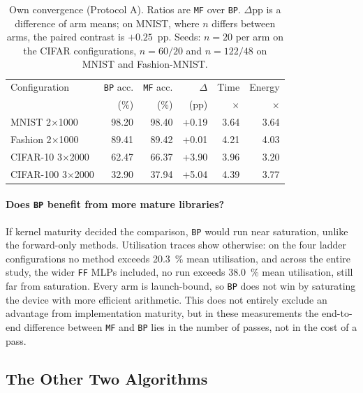 \documentclass{llncs}
\newcommand{\FF}{\texttt{FF}}
\newcommand{\MF}{\texttt{MF}}
\newcommand{\BP}{\texttt{BP}}
\begin{document}
\begin{table}[tb]
  \centering
  \caption{Own convergence (Protocol A). Ratios are \MF{} over \BP{}. $\Delta$pp is a difference of arm means; on
    MNIST, where $n$ differs between arms, the paired contrast is
    $+\num{0.25}$~pp. Seeds: $n=\num{20}$ per arm on the CIFAR
    configurations, $n=\num{60}/\num{20}$ and $n=\num{122}/\num{48}$ on MNIST
    and Fashion-MNIST.}
  \label{tab:conv}
  \setlength{\tabcolsep}{8pt}
  \footnotesize
  \begin{tabular}{lrrrrr}
    \toprule
    Configuration & \BP{} acc. & \MF{} acc. & $\Delta$ & Time & Energy \\
                  & (\%)       & (\%)       & (pp)     & $\times$ & $\times$ \\
    \midrule
    MNIST 2$\times$1000 & 98.20 & 98.40 & +0.19 & 3.64 & 3.64 \\
    Fashion 2$\times$1000 & 89.41 & 89.42 & +0.01 & 4.21 & 4.03 \\
    CIFAR-10 3$\times$2000 & 62.47 & 66.37 & +3.90 & 3.96 & 3.20 \\
    CIFAR-100 3$\times$2000 & 32.90 & 37.94 & +5.04 & 4.39 & 3.77 \\
    \bottomrule
  \end{tabular}
\end{table}

\paragraph{Does \BP{} benefit from more mature libraries?}
If kernel maturity decided the comparison, \BP{} would run near saturation,
unlike the forward-only methods. Utilisation traces show otherwise: on the four ladder configurations no method exceeds
\SI{20.3}{\percent} mean utilisation, and across the entire study, the wider \FF{} MLPs included, no run exceeds
\SI{38.0}{\percent} mean utilisation, still far from saturation. Every arm is launch-bound, so \BP{} does not win by
saturating the device with more efficient arithmetic. This does not entirely
exclude an advantage from implementation maturity, but in these measurements
the end-to-end difference between \MF{} and \BP{} lies in the number of passes,
not in the cost of a pass.

\subsection{The Other Two Algorithms}
\label{sec:ffcafo}
\end{document}
